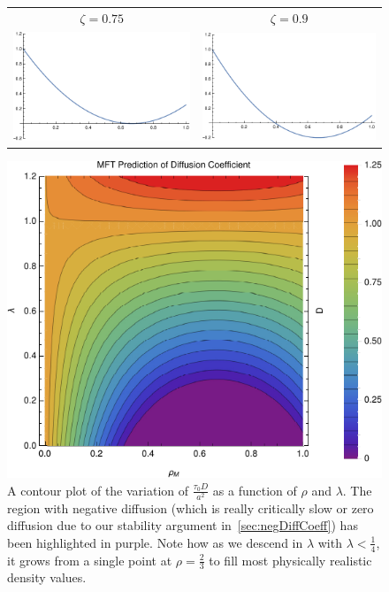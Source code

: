 \begin{figure}[h!]
\begin{center}
\begin{tabular}{c c}
     $\zeta = 0.75$  & $\zeta = 0.9$ \\
     \includegraphics[width=0.49\linewidth]{analytics/images/diffCoeffs/diffCoeff-0-75}  & \includegraphics[width=0.49 \linewidth]{analytics/images/diffCoeffs/diffCoeff-0-9} \\
    \end{tabular}
\end{center}
    \vspace{-2em}
\end{figure}

\begin{figure}[h!]
 \caption{\label{fig:diffCoeffDensityPlot} A contour plot of the variation of $\frac{\tau_0 D}{a^2}$ as a function of $\rho$ and $\lambda$. The region with negative diffusion (which is really critically slow or zero diffusion due
 to our stability argument in~\ref{sec:negDiffCoeff}) has been highlighted in purple. Note how as we descend in $\lambda$ with $\lambda<\frac{1}{4}$, it grows from a single point at $ \rho = \frac{2}{3}$
 to fill most physically realistic density values.}
 \includegraphics[width=0.99\linewidth]{analytics/images/newAnalFlow}
\end{figure}


